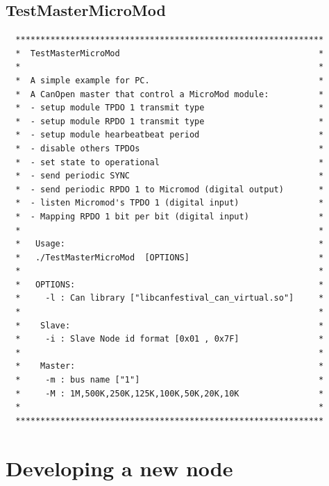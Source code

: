 \documentclass[12pt,english,a4paper]{book}
\begin{document}
\bigskip{}



\subsection{TestMasterMicroMod }



\begin{verbatim}
  **************************************************************
  *  TestMasterMicroMod                                        *
  *                                                            *
  *  A simple example for PC.                                  *
  *  A CanOpen master that control a MicroMod module:          *
  *  - setup module TPDO 1 transmit type                       *
  *  - setup module RPDO 1 transmit type                       *
  *  - setup module hearbeatbeat period                        *
  *  - disable others TPDOs                                    *
  *  - set state to operational                                *
  *  - send periodic SYNC                                      *
  *  - send periodic RPDO 1 to Micromod (digital output)       *
  *  - listen Micromod's TPDO 1 (digital input)                *
  *  - Mapping RPDO 1 bit per bit (digital input)              *
  *                                                            *
  *   Usage:                                                   *
  *   ./TestMasterMicroMod  [OPTIONS]                          *
  *                                                            *
  *   OPTIONS:                                                 *
  *     -l : Can library ["libcanfestival_can_virtual.so"]     *
  *                                                            *
  *    Slave:                                                  *
  *     -i : Slave Node id format [0x01 , 0x7F]                *
  *                                                            *
  *    Master:                                                 *
  *     -m : bus name ["1"]                                    *
  *     -M : 1M,500K,250K,125K,100K,50K,20K,10K                *
  *                                                            *
  **************************************************************
\end{verbatim}


\section{Developing a new node}
\end{document}
